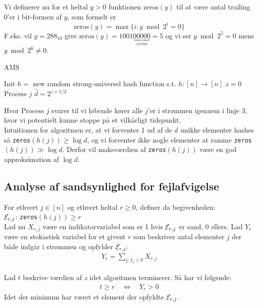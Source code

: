 Vi definerer nu for et heltal $y > 0$ funktionen zeros$(y)$ til at være antal trailing 0'er i bit-formen af $y$, som formelt er
$$
\text{zeros}(y) = \max\{i : y \bmod 2^i = 0\}
$$
F.eks. vil $y = 288_{10}$ give $\text{zeros}(y) = 1001 \underbrace{00000}_{zeros} = 5$ og vi ser $y \bmod 2^5 = 0$ mens $y \bmod 2^6 \neq 0$.\\


\begin{algorithm}[H] \caption{AMS} \label{alg:ams}
  \nonl Init\;
  $h =$ new random strong-universel hash function s.t. $h : [n] \rightarrow [n]$\;
  $z = 0$\;
  \nonl Process $j$\;
  \Return $\hat d = 2^{z + 1/2}$
\end{algorithm}\vspace{1em}

Hvor Process $j$ svarer til vi løbende kører alle $j$'er i strømmen igennem i linje 3, hvor vi potentielt kunne stoppe på et vilkårligt tidspunkt.\\

Intuitionen for algoritmen er, at vi forventer 1 ud af de $d$ unikke elementer hashes så \texttt{zeros}$(h(j)) \geq \log d$, og vi forventer ikke nogle elementer at ramme \texttt{zeros}$(h(j)) \gg \log d$. Derfor vil maksværdien af \texttt{zeros}$(h(j))$ være en god approksimation af $\log d$.


\subsection{Analyse af sandsynlighed for fejlafvigelse}

For ethvert $j \in [n]$ og ethvert heltal $r \geq 0$, definer da begivenheden:\\
${\mathcal{E}}_{r,j}$: \texttt{zeros}$(h(j)) \geq r$\\

Lad nu $X_{r,j}$ være en indikatorvariabel som er 1 hvis ${\mathcal{E}}_{r,j}$ er sand, 0 ellers. Lad $Y_r$ være en stokastisk variabel for et givent $r$ som beskriver antal elementer $j$ der både indgår i strømmen og opfylder ${\mathcal{E}}_{r,j}$:
\begin{align}
  Y_r = \sum_{j: f_j > 0} X_{r,j} \label{eq:yr-def}
\end{align}

Lad $t$ beskrive værdien af $z$ idet algoritmen terminerer. Så har vi følgende:
\begin{align}
  t \geq r \quad \Longleftrightarrow \quad Y_r > 0  \label{eq:t-greater-eq-r}
\end{align}
Idet der minimum har været et element der opfyldte ${\mathcal{E}}_{r,j}$.\\

